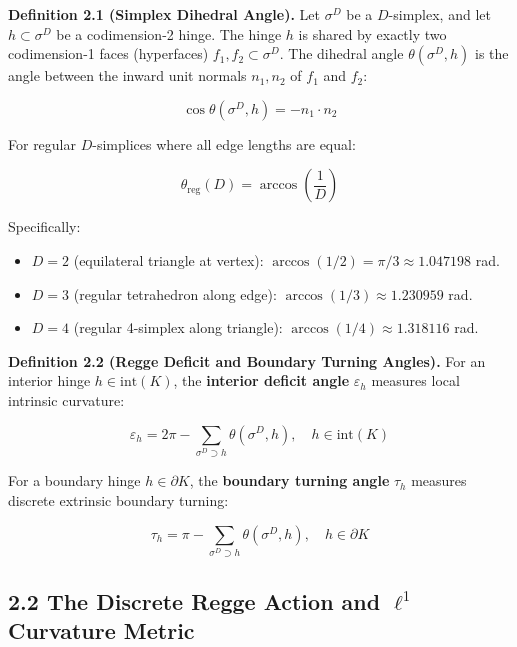 \documentclass[11pt]{article}
\begin{document}
\textbf{Definition 2.1 (Simplex Dihedral Angle).} Let $\sigma^D$ be a $D$-simplex, and let $h \subset \sigma^D$ be a codimension-2 hinge. The hinge $h$ is shared by exactly two codimension-1 faces (hyperfaces) $f_1, f_2 \subset \sigma^D$. The dihedral angle $\theta(\sigma^D, h)$ is the angle between the inward unit normals $n_1, n_2$ of $f_1$ and $f_2$:

\begin{equation*}
\cos \theta(\sigma^D, h) = - n_1 \cdot n_2
\end{equation*}

For regular $D$-simplices where all edge lengths are equal:

\begin{equation*}
\theta_{\mathrm{reg}}(D) = \arccos\left(\frac{1}{D}\right)
\end{equation*}

Specifically:

\begin{itemize}[leftmargin=1.4em,itemsep=0.2em]
\item $D=2$ (equilateral triangle at vertex): $\arccos(1/2) = \pi/3 \approx 1.047198$ rad.
\item $D=3$ (regular tetrahedron along edge): $\arccos(1/3) \approx 1.230959$ rad.
\item $D=4$ (regular 4-simplex along triangle): $\arccos(1/4) \approx 1.318116$ rad.
\end{itemize}
\textbf{Definition 2.2 (Regge Deficit and Boundary Turning Angles).} For an interior hinge $h \in \mathrm{int}(K)$, the \textbf{interior deficit angle} $\varepsilon_h$ measures local intrinsic curvature:

\begin{equation*}
\varepsilon_h = 2\pi - \sum_{\sigma^D \supset h} \theta(\sigma^D, h), \quad h \in \mathrm{int}(K)
\end{equation*}

For a boundary hinge $h \in \partial K$, the \textbf{boundary turning angle} $\tau_h$ measures discrete extrinsic boundary turning:

\begin{equation*}
\tau_h = \pi - \sum_{\sigma^D \supset h} \theta(\sigma^D, h), \quad h \in \partial K
\end{equation*}

\subsection{\texorpdfstring{2.2 The Discrete Regge Action and $\ell^1$ Curvature Metric}{2.2 The Discrete Regge Action and ℓ¹ Curvature Metric}}
\end{document}
